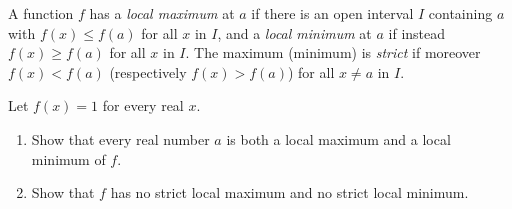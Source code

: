 A function $f$ has a \emph{local maximum} at $a$ if there is an open interval $I$ containing $a$ with $f(x)\le f(a)$ for all $x$ in $I$, and a \emph{local minimum} at $a$ if instead $f(x)\ge f(a)$ for all $x$ in $I$. The maximum (minimum) is \emph{strict} if moreover $f(x)<f(a)$ (respectively $f(x)>f(a)$) for all $x\ne a$ in $I$.

Let $f(x)=1$ for every real $x$.
\begin{enumerate}
\item[(a)] Show that every real number $a$ is both a local maximum and a local minimum of $f$.
\item[(b)] Show that $f$ has no strict local maximum and no strict local minimum.
\end{enumerate}

